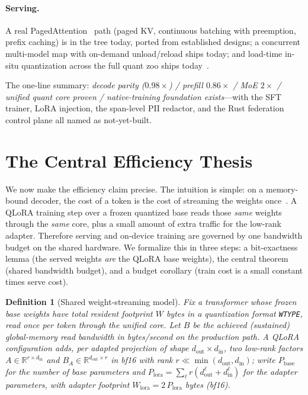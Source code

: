\documentclass[11pt]{article}
\newtheorem{definition}{Definition}
\begin{document}
\paragraph{Serving.} A real PagedAttention~\cite{kwon2023} path (paged KV, continuous batching with preemption, prefix caching) is in the tree today, ported from established designs; a concurrent multi-model map with on-demand unload/reload ships today; and load-time in-situ quantization across the full quant zoo ships today~\cite{hanzo-platform}.

The one-line summary: \emph{decode parity ($0.98\times$) / prefill $0.86\times$ / MoE $2\times$ / unified quant core proven / native-training foundation exists}---with the SFT trainer, LoRA injection, the span-level PII redactor, and the Rust federation control plane all named as not-yet-built.

\section{The Central Efficiency Thesis}
\label{sec:thesis}

We now make the efficiency claim precise. The intuition is simple: on a memory-bound decoder, the cost of a token is the cost of streaming the weights once~\cite{williams2009}. A QLoRA training step over a frozen quantized base reads those \emph{same} weights through the \emph{same} core, plus a small amount of extra traffic for the low-rank adapter. Therefore serving and on-device training are governed by one bandwidth budget on the shared hardware. We formalize this in three steps: a bit-exactness lemma (the served weights \emph{are} the QLoRA base weights), the central theorem (shared bandwidth budget), and a budget corollary (train cost is a small constant times serve cost).

\begin{definition}[Shared weight-streaming model]
\label{def:model}
Fix a transformer whose frozen base weights have total resident footprint $W$ bytes in a quantization format \texttt{WTYPE}, read once per token through the unified core. Let $B$ be the achieved (sustained) global-memory read bandwidth in bytes/second on the production path. A \emph{QLoRA configuration} adds, per adapted projection of shape $d_{\text{out}}\times d_{\text{in}}$, two low-rank factors $A\in\mathbb{R}^{r\times d_{\text{in}}}$ and $B_{\!A}\in\mathbb{R}^{d_{\text{out}}\times r}$ in bf16 with rank $r \ll \min(d_{\text{out}},d_{\text{in}})$; write $P_{\text{base}}$ for the number of base parameters and $P_{\text{lora}} = \sum_\ell r(d^\ell_{\text{out}}+d^\ell_{\text{in}})$ for the adapter parameters, with adapter footprint $W_{\text{lora}} = 2\,P_{\text{lora}}$ bytes (bf16).
\end{definition}
\end{document}
